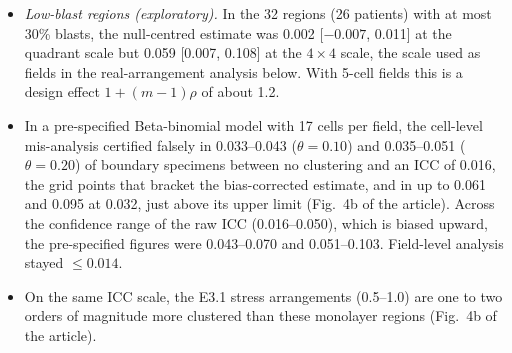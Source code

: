 \documentclass[11pt]{article}
\theoremstyle{remark}
\theoremstyle{definition}
\begin{document}
\begin{itemize}
\item \emph{Low-blast regions (exploratory).} In the 32 regions (26 patients) with at most 30\% blasts, the null-centred estimate was 0.002 [$-0.007$, 0.011] at the quadrant scale but 0.059 [0.007, 0.108] at the $4\times4$ scale, the scale used as fields in the real-arrangement analysis below. With 5-cell fields this is a design effect $1+(m-1)\rho$ \cite{kish1965} of about 1.2.
\item In a pre-specified Beta-binomial model with 17 cells per field, the cell-level mis-analysis certified falsely in 0.033--0.043 ($\theta=0.10$) and 0.035--0.051 ($\theta=0.20$) of boundary specimens between no clustering and an ICC of 0.016, the grid points that bracket the bias-corrected estimate, and in up to 0.061 and 0.095 at 0.032, just above its upper limit (Fig.~4b of the article). Across the confidence range of the raw ICC (0.016--0.050), which is biased upward, the pre-specified figures were 0.043--0.070 and 0.051--0.103. Field-level analysis stayed $\le0.014$.
\item On the same ICC scale, the E3.1 stress arrangements (0.5--1.0) are one to two orders of magnitude more clustered than these monolayer regions (Fig.~4b of the article).
\end{itemize}
\end{document}
